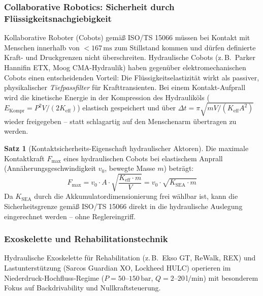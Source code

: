 ﻿\documentclass[a4paper,12pt]{scrreprt}
\theoremstyle{definition}
\newtheorem{satz}{Satz}[section]
\begin{document}
\subsubsection{Collaborative Robotics: Sicherheit durch Flüssigkeitsnachgiebigkeit}

Kollaborative Roboter (Cobots) gemäß ISO/TS 15066 müssen bei Kontakt
mit Menschen innerhalb von $< 167\,\mathrm{ms}$ zum Stillstand kommen
und dürfen definierte Kraft- und Druckgrenzen nicht überschreiten.
Hydraulische Cobots (z.\,B.\ Parker Hannifin ETX, Moog CMA-Hydraulik)
haben gegenüber elektromechanischen Cobots einen entscheidenden Vorteil:
Die Flüssigkeitselastizität wirkt als passiver, physikalischer
\emph{Tiefpassfilter} für Krafttransienten. Bei einem Kontakt-Aufprall
wird die kinetische Energie in der Kompression des Hydrauliköls
($E_{\mathrm{Kompr}} = P^2 V / (2 K_{\mathrm{eff}})$) elastisch gespeichert
und über $\Delta t = \pi \sqrt{m V / (K_{\mathrm{eff}} A^2)}$ wieder
freigegeben -- statt schlagartig auf den Menschenarm übertragen zu werden.

\begin{satz}[Kontaktsicherheits-Eigenschaft hydraulischer Aktoren]
  Die maximale Kontaktkraft $F_{\max}$ eines hydraulischen Cobots bei
  elastischem Anprall (Annäherungsgeschwindigkeit $v_0$, bewegte Masse $m$)
  beträgt:
  \begin{equation}
    F_{\max} = v_0 \cdot A \cdot \sqrt{\frac{K_{\mathrm{eff}} \cdot m}{V}}
             = v_0 \cdot \sqrt{K_{\mathrm{SEA}} \cdot m}
    \label{eq:kontaktkraft_max}
  \end{equation}
  Da $K_{\mathrm{SEA}}$ durch die Akkumulatordimensionierung frei
  wählbar ist, kann die Sicherheitsgrenze gemäß ISO/TS 15066 direkt
  in die hydraulische Auslegung eingerechnet werden -- ohne Regler\-eingriff.
\end{satz}

\subsubsection{Exoskelette und Rehabilitationstechnik}

Hydraulische Exoskelette für Rehabilitation (z.\,B.\ Ekso GT,
ReWalk, REX) und Lastunterstützung (Sarcos Guardian XO,
Lockheed HULC) operieren im Niederdruck-Hochfluss-Regime
($P = 50$--$150\,\mathrm{bar}$, $Q = 2$--$20\,\mathrm{l/min}$)
mit besonderem Fokus auf Backdrivability und Nullkraftsteuerung.
\end{document}
